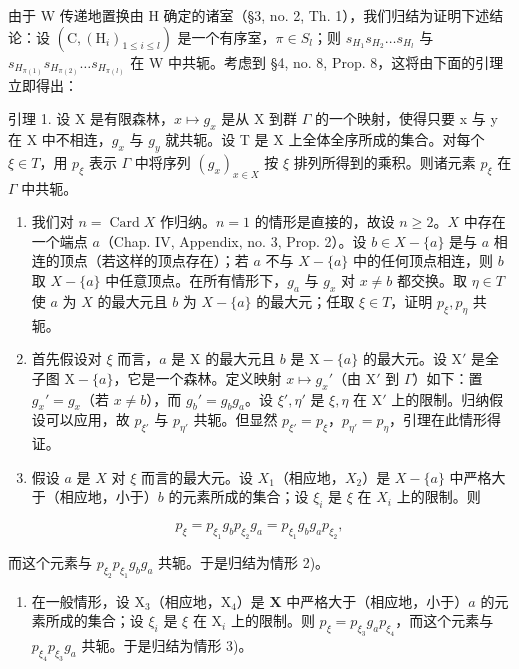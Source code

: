 由于 W 传递地置换由 H 确定的诸室（§3, no. 2, Th. 1），我们归结为证明下述结论：设 \((\mathrm{C},(\mathrm{H}_{i})_{1\leqslant i\leqslant l})\) 是一个有序室，\(\pi\in S_{l}\)；则 \(s_{H_{1}}s_{H_{2}}\ldots s_{H_{l}}\) 与 \(s_{H_{\pi(1)}}s_{H_{\pi(2)}}\ldots s_{H_{\pi(l)}}\) 在 W 中共轭。考虑到 §4, no. 8, Prop. 8，这将由下面的引理立即得出：

引理 1. 设 X 是有限森林，\(x \mapsto g_{x}\) 是从 X 到群 \(\Gamma\) 的一个映射，使得只要 x 与 y 在 X 中不相连，\(g_{x}\) 与 \(g_{y}\) 就共轭。设 T 是 X 上全体全序所成的集合。对每个 \(\xi \in T\)，用 \(p_{\xi}\) 表示 \(\Gamma\) 中将序列 \((g_{x})_{x \in X}\) 按 \(\xi\) 排列所得到的乘积。则诸元素 \(p_{\xi}\) 在 \(\Gamma\) 中共轭。

\begin{enumerate}
\def\labelenumi{\arabic{enumi})}
\item
  我们对 \(n = \operatorname{Card} X\) 作归纳。\(n = 1\) 的情形是直接的，故设 \(n \geqslant 2\)。\(X\) 中存在一个端点 \(a\)（Chap. IV, Appendix, no. 3, Prop. 2）。设 \(b \in X - \{a\}\) 是与 \(a\) 相连的顶点（若这样的顶点存在）；若 \(a\) 不与 \(X - \{a\}\) 中的任何顶点相连，则 \(b\) 取 \(X - \{a\}\) 中任意顶点。在所有情形下，\(g_a\) 与 \(g_x\) 对 \(x \neq b\) 都交换。取 \(\eta \in T\) 使 \(a\) 为 \(X\) 的最大元且 \(b\) 为 \(X - \{a\}\) 的最大元；任取 \(\xi \in T\)，证明 \(p_\xi, p_\eta\) 共轭。
\item
  首先假设对 \(\xi\) 而言，\(a\) 是 X 的最大元且 \(b\) 是 \(\mathrm{X} - \{a\}\) 的最大元。设 \(\mathrm{X}'\) 是全子图 \(\mathrm{X} - \{a\}\)，它是一个森林。定义映射 \(x \mapsto g_x'\)（由 \(\mathrm{X}'\) 到 \(\Gamma\)）如下：置 \(g_x' = g_x\)（若 \(x \neq b\)），而 \(g_b' = g_b g_a\)。设 \(\xi', \eta'\) 是 \(\xi, \eta\) 在 \(\mathrm{X}'\) 上的限制。归纳假设可以应用，故 \(p_{\xi'}\) 与 \(p_{\eta'}\) 共轭。但显然 \(p_{\xi'} = p_{\xi}\)，\(p_{\eta'} = p_{\eta}\)，引理在此情形得证。
\item
  假设 \(a\) 是 \(X\) 对 \(\xi\) 而言的最大元。设 \(X_1\)（相应地，\(X_2\)）是 \(X - \{a\}\) 中严格大于（相应地，小于）\(b\) 的元素所成的集合；设 \(\xi_i\) 是 \(\xi\) 在 \(X_i\) 上的限制。则
\end{enumerate}

\[
p _ {\xi} = p _ {\xi_ {1}} g _ {b} p _ {\xi_ {2}} g _ {a} = p _ {\xi_ {1}} g _ {b} g _ {a} p _ {\xi_ {2}},
\]

而这个元素与 \(p_{\xi_2}p_{\xi_1}g_b g_a\) 共轭。于是归结为情形 2)。

\begin{enumerate}
\def\labelenumi{\arabic{enumi})}
\setcounter{enumi}{3}
\tightlist
\item
  在一般情形，设 \(\mathrm{X}_3\)（相应地，\(\mathrm{X}_4\)）是 \(\mathbf{X}\) 中严格大于（相应地，小于）\(a\) 的元素所成的集合；设 \(\xi_i\) 是 \(\xi\) 在 \(\mathrm{X}_i\) 上的限制。则 \(p_{\xi} = p_{\xi_3}g_a p_{\xi_4}\)，而这个元素与 \(p_{\xi_4}p_{\xi_3}g_a\) 共轭。于是归结为情形 3)。
\end{enumerate}

